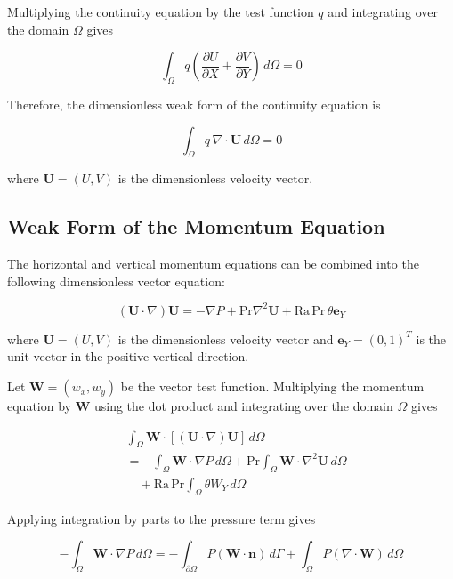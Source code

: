 \documentclass[preprint,3p,number]{elsarticle}
\begin{document}
Multiplying the continuity equation by the test function $q$
and integrating over the domain $\Omega$ gives

\begin{equation}
\int_{\Omega}
q\left(
\frac{\partial U}{\partial X}
+\frac{\partial V}{\partial Y}
\right)\,d\Omega=0
\end{equation}

Therefore, the dimensionless weak form of the continuity equation is

\begin{equation}
\boxed{
\int_{\Omega}q\,\nabla\cdot\mathbf{U}\,d\Omega=0
}
\end{equation}

where $\mathbf{U}=(U,V)$ is the dimensionless velocity vector.

\subsection{Weak Form of the Momentum Equation}

The horizontal and vertical momentum equations can be combined
into the following dimensionless vector equation:

\begin{equation}
(\mathbf{U}\cdot\nabla)\mathbf{U}
=-\nabla P
+\mathrm{Pr}\nabla^2\mathbf{U}
+\mathrm{Ra}\,\mathrm{Pr}\,\theta\mathbf{e}_Y
\end{equation}

where $\mathbf{U}=(U,V)$ is the dimensionless velocity vector
and $\mathbf{e}_Y=(0,1)^T$ is the unit vector in the positive
vertical direction.

Let $\mathbf{W}=(w_x,w_y)$ be the vector test function.
Multiplying the momentum equation by $\mathbf{W}$ using the
dot product and integrating over the domain $\Omega$ gives

\begin{align}
&\int_{\Omega}\mathbf{W}\cdot
[(\mathbf{U}\cdot\nabla)\mathbf{U}]\,d\Omega
\nonumber\\
&=-\int_{\Omega}\mathbf{W}\cdot\nabla P\,d\Omega
+\mathrm{Pr}\int_{\Omega}
\mathbf{W}\cdot\nabla^2\mathbf{U}\,d\Omega
\nonumber\\
&\quad+\mathrm{Ra}\,\mathrm{Pr}
\int_{\Omega}\theta W_Y\,d\Omega
\end{align}

Applying integration by parts to the pressure term gives

\begin{equation}
-\int_{\Omega}\mathbf{W}\cdot\nabla P\,d\Omega
=
-\int_{\partial\Omega}
P(\mathbf{W}\cdot\mathbf{n})\,d\Gamma
+\int_{\Omega}P(\nabla\cdot\mathbf{W})\,d\Omega
\end{equation}
\end{document}
